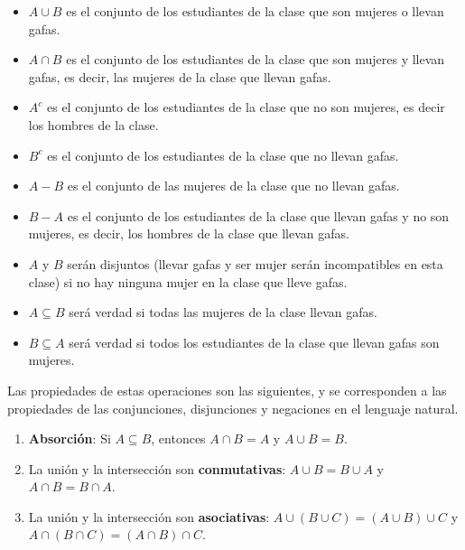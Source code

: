 \documentclass[
]{book}
\theoremstyle{definition}
\theoremstyle{definition}
\theoremstyle{definition}
\theoremstyle{definition}
\theoremstyle{remark}
\begin{document}
\begin{itemize}
\item
  \(A\cup B\) es el conjunto de los estudiantes de la clase que son mujeres o llevan gafas.
\item
  \(A \cap B\) es el conjunto de los estudiantes de la clase que son mujeres y llevan gafas, es decir, las mujeres de la clase que llevan gafas.
\item
  \(A^c\) es el conjunto de los estudiantes de la clase que no son mujeres, es decir los hombres de la clase.
\item
  \(B^c\) es el conjunto de los estudiantes de la clase que no llevan gafas.
\item
  \(A-B\) es el conjunto de las mujeres de la clase que no llevan gafas.
\item
  \(B-A\) es el conjunto de los estudiantes de la clase que llevan gafas y no son mujeres, es decir, los hombres de la clase que llevan gafas.
\item
  \(A\) y \(B\) serán disjuntos (llevar gafas y ser mujer serán incompatibles en esta clase) si no hay ninguna mujer en la clase que lleve gafas.
\item
  \(A\subseteq B\) será verdad si todas las mujeres de la clase llevan gafas.
\item
  \(B\subseteq A\) será verdad si todos los estudiantes de la clase que llevan gafas son mujeres.
\end{itemize}

Las propiedades de estas operaciones son las siguientes, y se corresponden a las propiedades de las conjunciones, disjunciones y negaciones en el lenguaje natural.

\begin{enumerate}
\def\labelenumi{\alph{enumi}.}
\item
  \textbf{Absorción}: Si \(A\subseteq B\), entonces \(A\cap B=A\) y \(A\cup B=B\).
\item
  La unión y la intersección son \textbf{conmutativas}: \(A\cup B=B\cup A\) y \(A\cap B=B\cap A\).
\item
  La unión y la intersección son \textbf{asociativas}: \(A\cup(B\cup C)=(A\cup B)\cup C\) y \(A\cap(B\cap C)=(A\cap B) \cap C\).
\end{enumerate}
\end{document}
